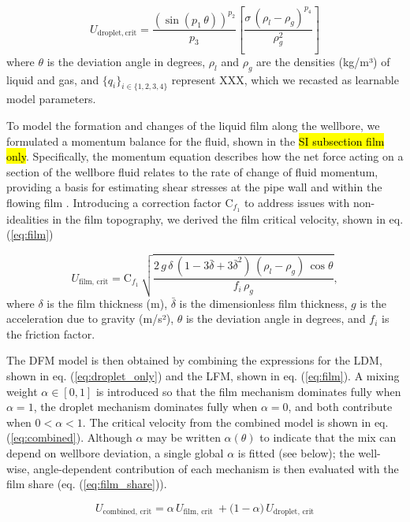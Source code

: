 \documentclass[journal=jacsat,manuscript=article]{achemso}
\theoremstyle{thmstyleone}%
\theoremstyle{thmstyletwo}%
\theoremstyle{thmstylethree}%
\begin{document}
\begin{equation}
U_{\mathrm{droplet,crit}} = \frac{\left( \sin (p_1 \, \theta)\right)^{p_2}}{p_3} \left[ \frac{\sigma \, (\rho_l - \rho_g)^{p_4}}{\rho_g^2} \right] 
\label{eq:droplet_only}
\end{equation}
where \( \theta \) is the deviation angle in degrees, \( \rho_l \) and \( \rho_g \) are the densities (kg/m³) of liquid and gas, and $\{ q_i \}_{i \in \{1,2,3,4\}}$ represent XXX, which we recasted as learnable model parameters. 

To model the formation and changes of the liquid film along the wellbore, we formulated a momentum balance for the fluid, shown in the  \hl {SI subsection film only}. Specifically, the momentum equation describes how the net force acting on a section of the wellbore fluid relates to the rate of change of fluid momentum, providing a basis for estimating shear stresses at the pipe wall and within the flowing film \cite{OKORO20192443, LANDJOBOPAGOU2020103641}. Introducing a correction factor $\mathrm{C}_{f_1}$ to address issues with non-idealities in the film topography, we derived the film critical velocity, shown in eq. (\ref{eq:film}) 

\begin{equation}
U_{{\mathrm{film,\,crit}}} = \mathrm{C}_{f_1} \, \sqrt{\frac{2 \, g \, \delta \, (1 - 3 \bar{\delta} + 3 \bar{\delta}^2) \, (\rho_l - \rho_g) \, \cos \theta}{f_i \, \rho_g}},
\label{eq:film}
\end{equation}
where \( \delta \) is the film thickness (m), \( \bar{\delta} \) is the dimensionless film thickness, $g$ is the acceleration due to gravity (m/s²), \( \theta \) is the deviation angle in degrees, and \( f_i \) is the friction factor.  

The DFM model is then obtained by combining the expressions for the LDM, shown in eq. (\ref{eq:droplet_only}) and the LFM, shown in eq. (\ref{eq:film}). A mixing weight $\alpha \in [0, 1]$ is introduced so that the film mechanism dominates fully when $\alpha = 1$, the droplet mechanism dominates fully when $\alpha = 0$, and both contribute when $0 < \alpha < 1$. The critical velocity from the combined model is shown in eq. (\ref{eq:combined}). Although $\alpha$ may be written $\alpha(\theta)$ to indicate that the mix can depend on wellbore deviation, a single global $\alpha$ is fitted (see below); the well-wise, angle-dependent contribution of each mechanism is then evaluated with the film share (eq. (\ref{eq:film_share})).

\begin{equation}
U_{\mathrm{combined,\,crit}} 
= \alpha\, U_{\mathrm{film,\,crit}}\
+ \bigl(1 - \alpha\bigr)\, U_{\mathrm{droplet,\,crit}}
\label{eq:combined}
\end{equation}
\end{document}
